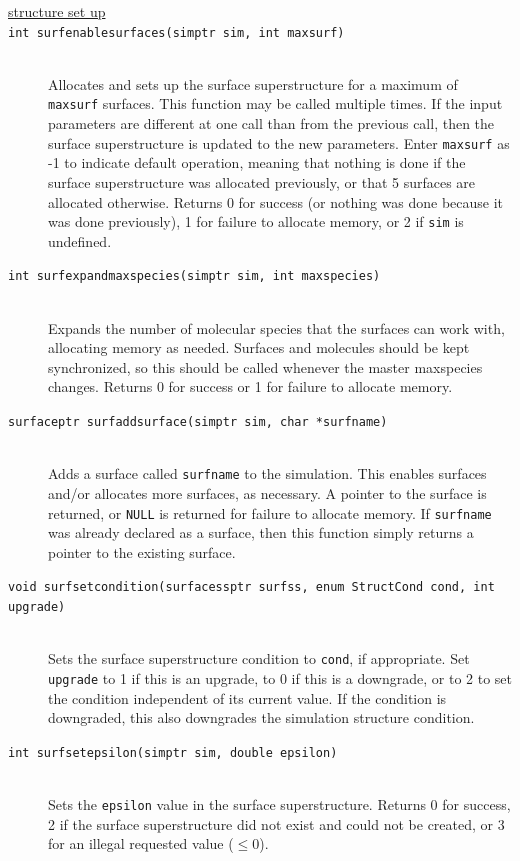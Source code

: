 \documentclass {scrbook}
\newcommand {\ttt} {\texttt}
\begin{document}
\begin{description}
\item[\underline{structure set up}]

\item[\ttt{int surfenablesurfaces(simptr sim, int maxsurf)}]
\hfill \\
Allocates and sets up the surface superstructure for a maximum of \ttt{maxsurf} surfaces. This function may be called multiple times. If the input parameters are different at one call than from the previous call, then the surface superstructure is updated to the new parameters. Enter \ttt{maxsurf} as -1 to indicate default operation, meaning that nothing is done if the surface superstructure was allocated previously, or that 5 surfaces are allocated otherwise. Returns 0 for success (or nothing was done because it was done previously), 1 for failure to allocate memory, or 2 if \ttt{sim} is undefined.

\item[\ttt{int surfexpandmaxspecies(simptr sim, int maxspecies)}]
\hfill \\
Expands the number of molecular species that the surfaces can work with, allocating memory as needed. Surfaces and molecules should be kept synchronized, so this should be called whenever the master maxspecies changes. Returns 0 for success or 1 for failure to allocate memory.

\item[\ttt{surfaceptr surfaddsurface(simptr sim, char *surfname)}]
\hfill \\
Adds a surface called \ttt{surfname} to the simulation. This enables surfaces and/or allocates more surfaces, as necessary. A pointer to the surface is returned, or \ttt{NULL} is returned for failure to allocate memory. If \ttt{surfname} was already declared as a surface, then this function simply returns a pointer to the existing surface.

\item[\ttt{void surfsetcondition(surfacessptr surfss, enum StructCond cond, int upgrade)}]
\hfill \\
Sets the surface superstructure condition to \ttt{cond}, if appropriate. Set \ttt{upgrade} to 1 if this is an upgrade, to 0 if this is a downgrade, or to 2 to set the condition independent of its current value. If the condition is downgraded, this also downgrades the simulation structure condition.

\item[\ttt{int surfsetepsilon(simptr sim, double epsilon)}]
\hfill \\
Sets the \ttt{epsilon} value in the surface superstructure. Returns 0 for success, 2 if the surface superstructure did not exist and could not be created, or 3 for an illegal requested value ($\leq 0$).


\end{description}
\end{document}
